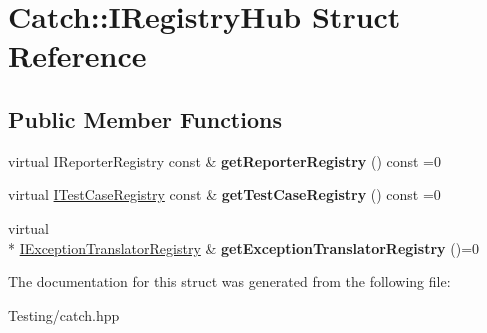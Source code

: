 \hypertarget{struct_catch_1_1_i_registry_hub}{\section{Catch\-:\-:I\-Registry\-Hub Struct Reference}
\label{struct_catch_1_1_i_registry_hub}
}
\subsection*{Public Member Functions}
\begin{DoxyCompactItemize}
\item 
\hypertarget{struct_catch_1_1_i_registry_hub_a55534563f7ecf7e20ec1e37285ebe54d}{virtual I\-Reporter\-Registry const \& {\bfseries get\-Reporter\-Registry} () const =0}\label{struct_catch_1_1_i_registry_hub_a55534563f7ecf7e20ec1e37285ebe54d}

\item 
\hypertarget{struct_catch_1_1_i_registry_hub_af4f6255f0c0f8f1f179fa9d7d4843076}{virtual \hyperlink{struct_catch_1_1_i_test_case_registry}{I\-Test\-Case\-Registry} const \& {\bfseries get\-Test\-Case\-Registry} () const =0}\label{struct_catch_1_1_i_registry_hub_af4f6255f0c0f8f1f179fa9d7d4843076}

\item 
\hypertarget{struct_catch_1_1_i_registry_hub_a3606988da110c016c5af3ae63454eb78}{virtual \\*
\hyperlink{struct_catch_1_1_i_exception_translator_registry}{I\-Exception\-Translator\-Registry} \& {\bfseries get\-Exception\-Translator\-Registry} ()=0}\label{struct_catch_1_1_i_registry_hub_a3606988da110c016c5af3ae63454eb78}

\end{DoxyCompactItemize}


The documentation for this struct was generated from the following file\-:\begin{DoxyCompactItemize}
\item 
Testing/catch.\-hpp\end{DoxyCompactItemize}
